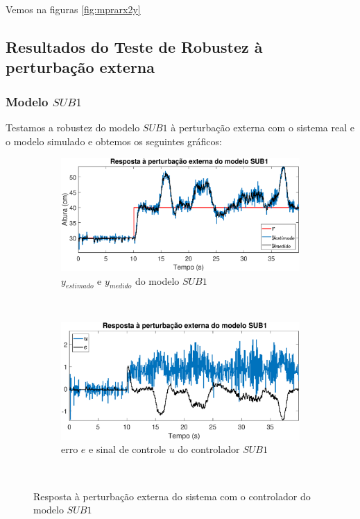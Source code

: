 Vemos na figuras \ref{fig:mprarx2y}

\subsection{Resultados do Teste de Robustez à perturbação externa}\label{rpe}

\subsubsection{Modelo $SUB1$}
Testamos a robustez do modelo $SUB1$ à perturbação externa com o sistema real e o modelo simulado e obtemos os seguintes gráficos:

\begin{figure}[htb]
	\centering
	\begin{subfigure}[t]{0.48\textwidth}
		\includegraphics[width=1\linewidth]{pextrsub1y}
		\caption[$y_{estimado}$ e $y_{medido}$ do modelo $SUB1$]{$y_{estimado}$ e $y_{medido}$ do modelo $SUB1$}
		\label{fig:pextrsub1y}
	\end{subfigure}
	~ %
	\begin{subfigure}[t]{0.48\textwidth}
		\includegraphics[width=1\linewidth]{pextrsub1e}
		\caption[erro $e$ e sinal de controle $u$ do controlador $SUB1$]{erro $e$ e sinal de controle $u$ do controlador $SUB1$}
		\label{fig:pextrsub1e}
	\end{subfigure}
	~ %
	
	\caption{Resposta à perturbação externa do sistema com o controlador do modelo $SUB1$}\label{fig:pextrsub1}
\end{figure}

